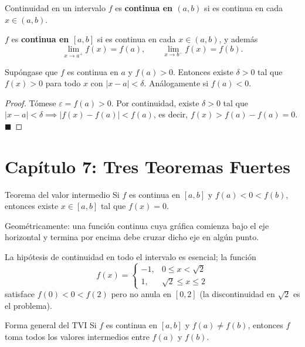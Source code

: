 \documentclass[12pt]{article}
\begin{document}
\begin{definicion}[]{Continuidad en un intervalo}
$f$ es \textbf{continua en $(a, b)$} si es continua en cada $x \in (a, b)$.

$f$ es \textbf{continua en $[a, b]$} si es continua en cada $x \in (a, b)$, y además
\[ \lim_{x \to a^+} f(x) = f(a), \qquad \lim_{x \to b^-} f(x) = f(b). \]
\end{definicion}

\begin{teorema}[3]{}
Supóngase que $f$ es continua en $a$ y $f(a) > 0$. Entonces existe $\delta > 0$ tal que $f(x) > 0$ para todo $x$ con $|x - a| < \delta$. Análogamente si $f(a) < 0$.
\end{teorema}

\begin{proof}
Tómese $\varepsilon = f(a) > 0$. Por continuidad, existe $\delta > 0$ tal que $|x-a| < \delta \implies |f(x)-f(a)| < f(a)$, es decir, $f(x) > f(a) - f(a) = 0$.
$\blacksquare$
\end{proof}

\section{Capítulo 7: Tres Teoremas Fuertes}

\begin{teorema}[1]{Teorema del valor intermedio}
Si $f$ es continua en $[a, b]$ y $f(a) < 0 < f(b)$, entonces existe $x \in [a, b]$ tal que $f(x) = 0$.
\end{teorema}

\begin{nota}[]{}
Geométricamente: una función continua cuya gráfica comienza bajo el eje horizontal y termina por encima debe cruzar dicho eje en algún punto.

La hipótesis de continuidad en todo el intervalo es esencial; la función
\[ f(x) = \begin{cases} -1, & 0 \leq x < \sqrt{2} \\ 1, & \sqrt{2} \leq x \leq 2 \end{cases} \]
satisface $f(0) < 0 < f(2)$ pero no anula en $[0, 2]$ (la discontinuidad en $\sqrt{2}$ es el problema).
\end{nota}

\begin{corolario}[]{Forma general del TVI}
Si $f$ es continua en $[a, b]$ y $f(a) \neq f(b)$, entonces $f$ toma todos los valores intermedios entre $f(a)$ y $f(b)$.
\end{corolario}
\end{document}
